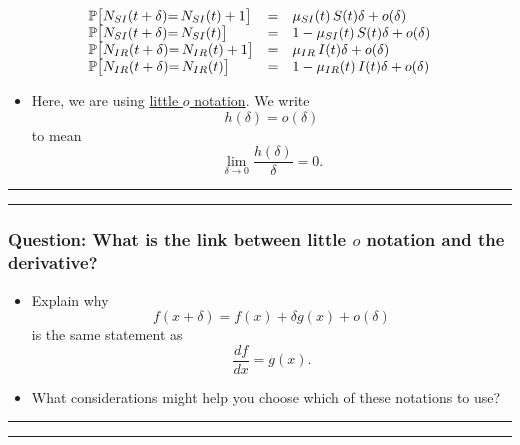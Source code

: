 \documentclass[]{article}
\providecommand{\tightlist}{%
  \setlength{\itemsep}{0pt}\setlength{\parskip}{0pt}}
\begin{document}
\[\begin{array}{lcl}
\mathbb{P}\big[N_{SI}(t+\delta){=\,} N_{SI}(t)+1\big] &=& \mu_{SI}(t) \, S(t) \delta + o(\delta)
\\
\mathbb{P}\big[N_{SI}(t+\delta){=\,} N_{SI}(t)\big] &=& 1-\mu_{SI}(t) \, S(t) \delta + o(\delta)
\\
\mathbb{P}\big[N_{IR}(t+\delta){=\,} N_{IR}(t)+1\big] &=& \mu_{IR} \, I(t) \delta + o(\delta)
\\
\mathbb{P}\big[N_{IR}(t+\delta){=\,} N_{IR}(t)\big] &=& 1-\mu_{IR}(t) \, I(t) \delta + o(\delta)
\end{array}\]

\begin{itemize}
\tightlist
\item
  Here, we are using
  \href{https://en.wikipedia.org/wiki/Big_O_notation\#Little-o_notation}{little
  \(o\) notation}. We write \[ h(\delta)=o(\delta)\] to mean
  \[ \lim_{\delta\to 0} \frac{h(\delta)}{\delta} = 0.\]
\end{itemize}

\begin{center}\rule{0.5\linewidth}{\linethickness}\end{center}

\begin{center}\rule{0.5\linewidth}{\linethickness}\end{center}

\subsubsection{\texorpdfstring{Question: What is the link between little
\(o\) notation and the
derivative?}{Question: What is the link between little o notation and the derivative?}}\label{question-what-is-the-link-between-little-o-notation-and-the-derivative}

\begin{itemize}
\item
  Explain why \[f(x+\delta)=f(x)+ \delta g(x) + o(\delta)\] is the same
  statement as \[ \frac{df}{dx} = g(x).\]
\item
  What considerations might help you choose which of these notations to
  use?
\end{itemize}

\begin{center}\rule{0.5\linewidth}{\linethickness}\end{center}

\begin{center}\rule{0.5\linewidth}{\linethickness}\end{center}
\end{document}
